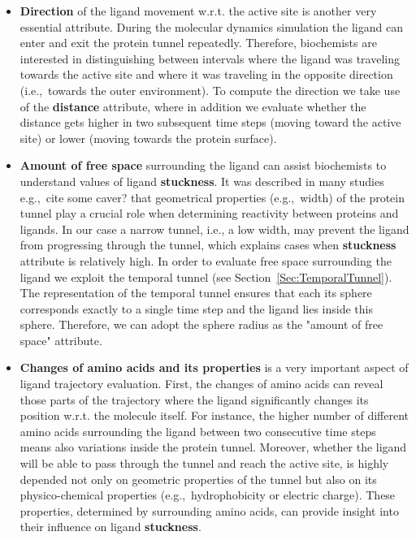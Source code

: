 \documentclass[twocolumn]{bmcart}%
\newcommand{\ie}{i.e.,~}
\newcommand{\eg}{e.g.,~}
\begin{document}
\begin{itemize}
\item \textbf{Direction} of the ligand movement w.r.t. the active site is another very essential attribute. 
During the molecular dynamics simulation the ligand can enter and exit the protein tunnel repeatedly. 
Therefore, biochemists are interested in distinguishing between intervals where the ligand was traveling towards the active site and where it was traveling in the opposite direction (\ie towards the outer environment). 
To compute the direction we take use of the \textbf{distance} attribute, where in addition we evaluate whether the distance gets higher in two subsequent time steps (moving toward the active site) or lower (moving towards the protein surface). 
   

\item \textbf{Amount of free space} surrounding the ligand can assist biochemists to understand values of ligand \textbf{stuckness}. 
It was described in many studies {\color{red}\eg cite some caver?} that geometrical properties (\eg width) of the protein tunnel play a crucial role when determining reactivity between proteins and ligands. 
In our case a narrow tunnel, i.e., a low width, may prevent the ligand from progressing through the tunnel, which explains cases when \textbf{stuckness} attribute is relatively high. 
In order to evaluate free space surrounding the ligand we exploit the temporal tunnel (see Section~\ref{Sec:TemporalTunnel}). 
The representation of the temporal tunnel ensures that each its sphere corresponds exactly to a single time step and the ligand lies inside this sphere. Therefore, we can adopt the sphere radius as the "amount of free space" attribute. 

\item \textbf{Changes of amino acids and its properties} is a very important aspect of ligand trajectory evaluation.
First, the changes of amino acids can reveal those parts of the trajectory where the ligand  significantly changes its position w.r.t. the molecule itself. 
For instance, the higher number of different amino acids surrounding the ligand between two consecutive time steps means also variations inside the protein tunnel.
Moreover, whether the ligand will be able to pass through the tunnel and reach the active site, is highly depended not only on geometric properties of the tunnel but also on its physico-chemical properties (\eg hydrophobicity or electric charge).
These properties, determined by surrounding amino acids, can provide insight into their influence on ligand \textbf{stuckness}.


\end{itemize}
\end{document}

